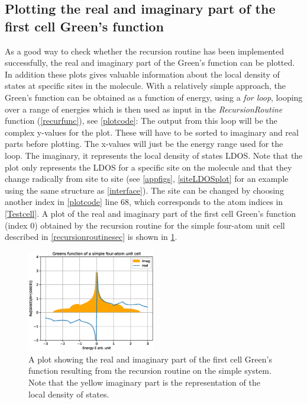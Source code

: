 \subsection{Plotting the real and imaginary part of the first cell Green's function}
As a good way to check whether the recursion routine has been implemented successfully, the real and imaginary part of the Green's function can be plotted. In addition these plots gives valuable information about the local density of states at specific sites in the molecule. With a relatively simple approach, the Green's function can be obtained as a function of energy, using a \textit{for loop}, looping over a range of energies which is then used as input in the \textit{RecursionRoutine} function (\cref{recurfunc}), see \cref{plotcode}:
\vspace{-1\baselineskip}
\vspace{\baselineskip}
The output from this loop will be the complex y-values for the plot. These will have to be sorted to imaginary and real parts before plotting. The x-values will just be the energy range used for the loop. The imaginary, it represents the local density of states LDOS. Note that the plot only represents the LDOS for a specific site on the molecule and that they change radically from site to site (see \cref{appfigs}, \cref{siteLDOSplot} for an example using the same structure as \cref{interface}). The site can be changed by choosing another index in \cref{plotcode} line 68, which corresponds to the atom indices in \cref{Testcell}. A plot of the real and imaginary part of the first cell Green's function (index 0) obtained by the recursion routine for the simple four-atom unit cell described in \cref{recursionroutinesec} is shown in \cref{imrealplot}.
\begin{figure}
	\centering
	\includegraphics[width = 0.5\textwidth]{Figures/imrealplot.eps}
	\caption{A plot showing the real and imaginary part of the first cell Green's function resulting from the recursion routine on the simple system. Note that the yellow imaginary part is the representation of the local density of states.}
	\label{imrealplot}
\end{figure}
